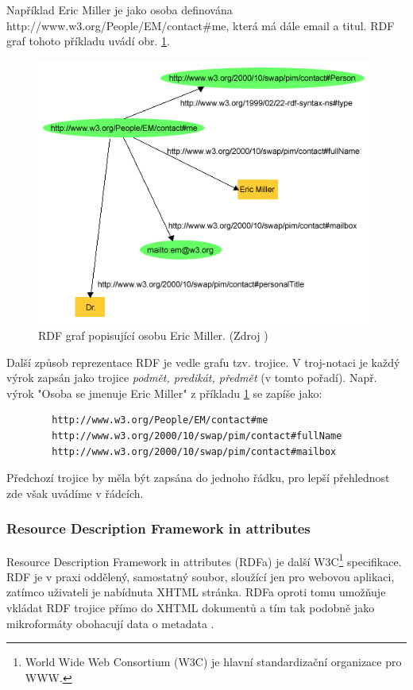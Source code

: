         Například Eric Miller je jako osoba definována http://www.w3.org/People/EM/contact\#me, která má dále email a titul. RDF graf tohoto příkladu uvádí obr. \ref{img:miller}.
        
        \begin{figure}[h]
        \begin{center}
        \includegraphics[width=11cm]{figures/rdf}
        \caption{RDF graf popisující osobu Eric Miller. (Zdroj \cite{RDFprimer})}
        \label{img:miller}
        \end{center}
        \end{figure}

        Další způsob reprezentace RDF je vedle grafu tzv. trojice. V troj-notaci je každý výrok zapsán jako trojice \textit{podmět, predikát, předmět} (v tomto pořadí). 
        Např. výrok "Osoba se jmenuje Eric Miller" z příkladu \ref{img:miller} se zapíše jako:
        
        \begin{verbatim}
        http://www.w3.org/People/EM/contact#me 
        http://www.w3.org/2000/10/swap/pim/contact#fullName 
        http://www.w3.org/2000/10/swap/pim/contact#mailbox
        \end{verbatim}
        Předchozí trojice by měla být zapsána do jednoho řádku, pro lepší přehlednost zde však uvádíme v řádcích.
        
        \subsubsection{Resource Description Framework in attributes} 
        
        Resource Description Framework in attributes (RDFa) je další W3C\footnote{World Wide Web Consortium (W3C) je hlavní standardizační organizace pro WWW.} specifikace.
        RDF je v praxi oddělený, samostatný soubor, sloužící jen pro webovou aplikaci, zatímco uživateli je nabídnuta XHTML stránka. 
        RDFa oproti tomu umožňuje vkládat RDF trojice přímo do XHTML dokumentů a tím tak podobně jako mikroformáty obohacují data o metadata \cite{RDFa}.
        
